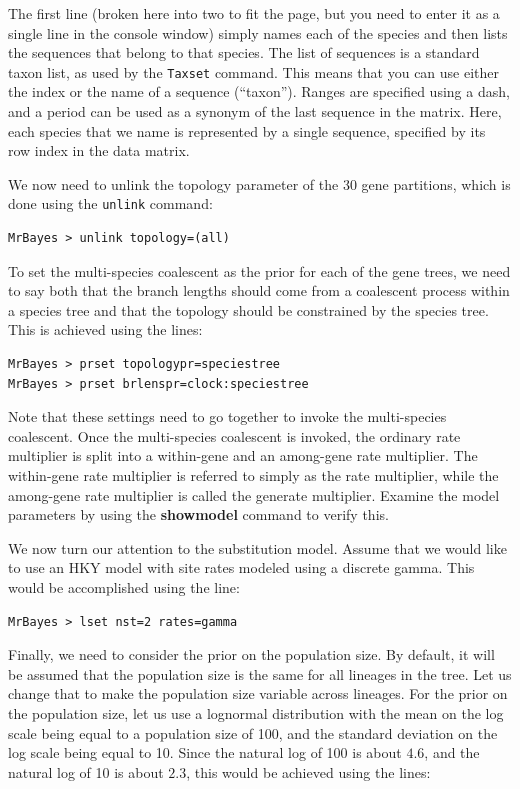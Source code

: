 \documentclass[12pt]{book}
\newcommand{\ttt}[1]{\texttt{#1} }
\begin{document}
The first line (broken here into two to fit the page, but you need to enter it as a single line in
the console window) simply names each of the species and then lists the sequences that belong to
that species.  The list of sequences is a standard taxon list, as used by the \ttt{Taxset} command.
This means that you can use either the index or the name of a sequence (``taxon''). Ranges are
specified using a dash, and a period can be used as a synonym of the last sequence in the matrix.
Here, each species that we name is represented by a single sequence, specified by its row index in
the data matrix.

We now need to unlink the topology parameter of the 30 gene partitions, which is done using the
\ttt{unlink} command:

\begin{verbatim}
MrBayes > unlink topology=(all)
\end{verbatim}

To set the multi-species coalescent as the prior for each of the gene trees, we need to say both
that the branch lengths should come from a coalescent process within a species tree and that the
topology should be constrained by the species tree. This is achieved using the lines:

\begin{singlespacing}
\begin{verbatim}
MrBayes > prset topologypr=speciestree
MrBayes > prset brlenspr=clock:speciestree
\end{verbatim}
\end{singlespacing}

Note that these settings need to go together to invoke the multi-species coalescent. Once the
multi-species coalescent is invoked, the ordinary rate multiplier is split into a within-gene and
an among-gene rate multiplier. The within-gene rate multiplier is referred to simply as the rate
multiplier, while the among-gene rate multiplier is called the generate multiplier. Examine the
model parameters by using the \textbf{showmodel} command to verify this.

We now turn our attention to the substitution model. Assume that we would like to use an HKY model
with site rates modeled using a discrete gamma. This would be accomplished using the line:

\begin{verbatim}
MrBayes > lset nst=2 rates=gamma
\end{verbatim}

Finally, we need to consider the prior on the population size. By default, it will be assumed that
the population size is the same for all lineages in the tree. Let us change that to make the
population size variable across lineages. For the prior on the population size, let us use a
lognormal distribution with the mean on the log scale being equal to a population size of 100, and
the standard deviation on the log scale being equal to 10. Since the natural log of 100 is about
$4.6$, and the natural log of 10 is about $2.3$, this would be achieved using the lines:
\end{document}
